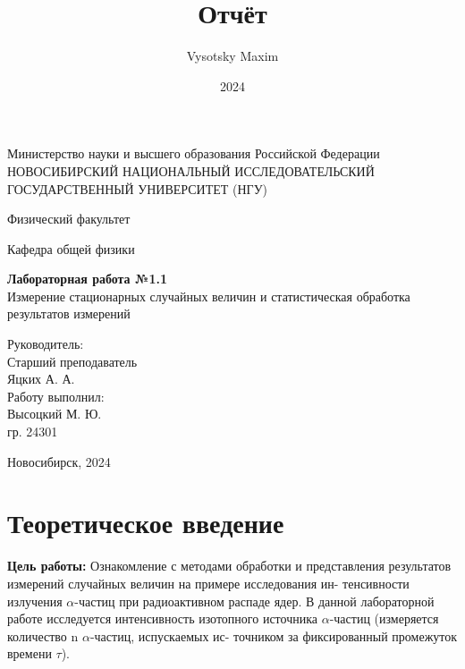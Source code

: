 \documentclass[a4paper,12pt]{article}
\author{Vysotsky Maxim}
\title{Отчёт}
\date{2024}
\begin{document}
	\begin{titlepage}
		\begin{center}
			{Министерство науки и высшего образования Российской Федерации
				НОВОСИБИРСКИЙ НАЦИОНАЛЬНЫЙ ИССЛЕДОВАТЕЛЬСКИЙ
				ГОСУДАРСТВЕННЫЙ УНИВЕРСИТЕТ (НГУ)}
		\end{center}
		\begin{center}
			{Физический факультет}
		\end{center}
		\begin{center}
			{Кафедра общей физики}
		\end{center}
		
		
		\vspace{7cm}
		{
			\begin{center}
				{\bf Лабораторная работа №1.1}\\
				Измерение стационарных случайных величин и статистическая обработка результатов измерений
			\end{center}
		}
		\vspace{2cm}
		\begin{flushright}
			{Руководитель:\\ Старший преподаватель\\
				Яцких А. А.\\
				Работу выполнил:\\
				Высоцкий М. Ю.\\
				\vspace{0.2cm}
				гр. 24301}
		\end{flushright}
		\vspace{3cm}
		\begin{center}
			Новосибирск, 2024
		\end{center}
	\end{titlepage}

\section{Теоретическое введение}
\textbf{Цель работы:} Ознакомление с методами обработки и представления
результатов измерений случайных величин на примере исследования ин-
тенсивности излучения $\alpha$-частиц при радиоактивном распаде ядер.
В данной лабораторной работе исследуется интенсивность изотопного
источника $\alpha$-частиц (измеряется количество n $\alpha$-частиц, испускаемых ис-
точником за фиксированный промежуток времени $\tau$).
\end{document}
